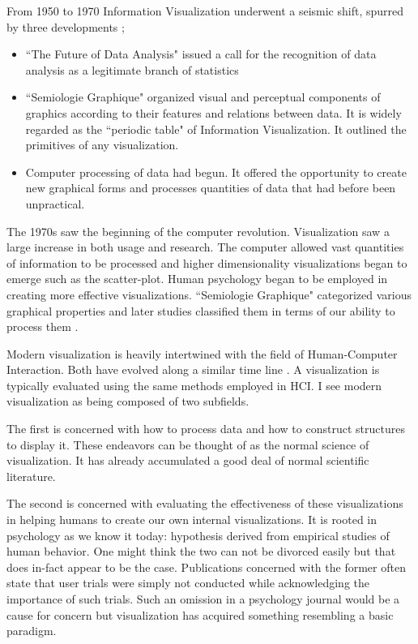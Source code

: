 \documentclass[a4paper, 10pt, titlepage, twocolumn, onehalfspace]{article}
\begin{document}
From 1950 to 1970 Information Visualization underwent a seismic shift, spurred by three developments \cite{friendly2001milestones};
\begin{itemize}
\item ``The Future of Data Analysis" issued a call for the recognition of data analysis as a legitimate branch of statistics \cite{tukey1962future}
\item ``Semiologie Graphique" \cite{bertin1973semiologie} organized visual and perceptual components of graphics according to their features and relations between data. It is widely regarded as the ``periodic table" of Information Visualization. It outlined the primitives of any visualization.
\item Computer processing of data had begun. It offered the opportunity to create new graphical forms and processes quantities of data that had before been unpractical.
\end{itemize}

The 1970s saw the beginning of the computer revolution. Visualization saw a large increase in both usage and research. The computer allowed vast quantities of information to be processed and higher dimensionality visualizations began to emerge such as the scatter-plot. Human psychology began to be employed in creating more effective visualizations. ``Semiologie Graphique" categorized various graphical properties and later studies classified them in terms of our ability to process them \cite{cleveland1984graphical}.

Modern visualization is heavily intertwined with the field of Human-Computer Interaction. Both have evolved along a similar time line \cite{myers1998brief}. A visualization is typically evaluated using the same methods employed in HCI. I see modern visualization as being composed of two subfields. 

The first is concerned with how to process data and how to construct structures to display it. These endeavors can be thought of as the normal science of visualization. It has already accumulated a good deal of normal scientific literature.

The second is concerned with evaluating the effectiveness of these visualizations in helping humans to create our own internal visualizations. It is rooted in psychology as we know it today: hypothesis derived from empirical studies of human behavior. One might think the two can not be divorced easily but that does in-fact appear to be the case. Publications concerned with the former often state that user trials were simply not conducted while acknowledging the importance of such trials. Such an omission in a psychology journal would be a cause for concern but visualization has acquired something resembling a basic paradigm.
\end{document}
